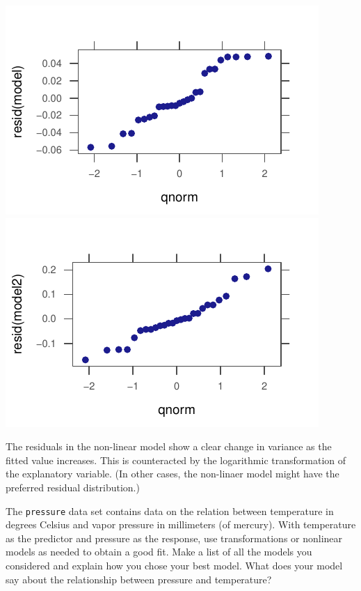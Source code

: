 \documentclass[twoside]{book}\usepackage[]{graphicx}\usepackage[]{xcolor}
\makeatletter
\def\maxwidth{ %
  \ifdim\Gin@nat@width>\linewidth
    \linewidth
  \else
    \Gin@nat@width
  \fi
}
\newenvironment{knitrout}{}{} %
\newcommand{\Rindex}[1]{\index{\texttt{#1}}}
\newcommand{\dataframe}[1]{{\color{blue!80!black}\texttt{#1}}\Rindex{#1}}
\makeatother
\begin{document}
\begin{solution}
\begin{knitrout}
{\centering \includegraphics[width=\maxwidth]{figures/fig-unnamed-chunk-230-1} 
\includegraphics[width=\maxwidth]{figures/fig-unnamed-chunk-230-2} 

}



\end{knitrout}
	
	The residuals in the non-linear model show a clear change 
	in variance as the fitted value increases.  This is counteracted by the logarithmic
	transformation of the explanatory variable.  (In other cases, the non-linaer model
	might have the preferred residual distribution.)
\end{solution}



\begin{problem}
The \dataframe{pressure} data set contains 
data on the relation between temperature in degrees Celsius and 
vapor pressure in millimeters (of mercury).
With temperature as the predictor and pressure as the response,
use transformations or nonlinear models as needed to obtain a good fit.
Make a list of all the models you considered and explain
how you chose your best model.
What does your model say about the relationship between 
pressure and temperature?
\end{problem}
\end{document}
